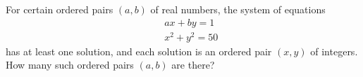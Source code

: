 For certain ordered pairs $(a,b)$ of real numbers, the system of equations \begin{eqnarray*} && ax+by =1\\ &&x^2+y^2=50\end{eqnarray*} has at least one solution, and each solution is an ordered pair $(x,y)$ of integers.  How many such ordered pairs $(a,b)$ are there?